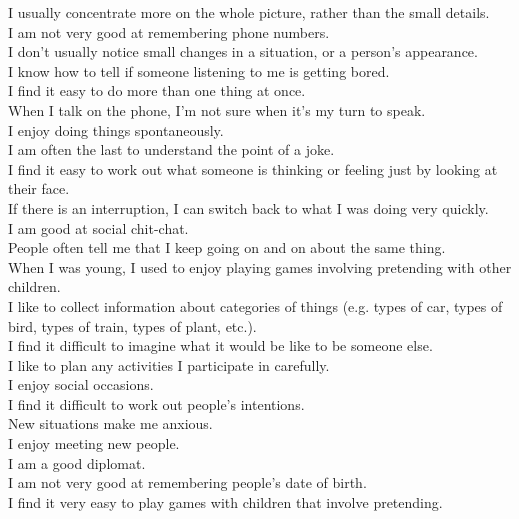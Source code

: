 \documentclass[a4paper, 11pt]{article}
\begin{document}
I usually concentrate more on the whole picture, rather than the small details.\\
I am not very good at remembering phone numbers.\\
I don't usually notice small changes in a situation, or a person's appearance.\\
I know how to tell if someone listening to me is getting bored.\\
I find it easy to do more than one thing at once.\\
When I talk on the phone, I'm not sure when it's my turn to speak.\\
I enjoy doing things spontaneously.\\
I am often the last to understand the point of a joke.\\
I find it easy to work out what someone is thinking or feeling just by looking at their face.\\
If there is an interruption, I can switch back to what I was doing very quickly. \\
I am good at social chit-chat.\\
People often tell me that I keep going on and on about the same thing.\\
When I was young, I used to enjoy playing games involving pretending with other children.\\
I like to collect information about categories of things (e.g. types of car, types of bird, types of train, types of plant, etc.).\\
I find it difficult to imagine what it would be like to be someone else.\\
I like to plan any activities I participate in carefully.\\
I enjoy social occasions.\\
I find it difficult to work out people's intentions.\\
New situations make me anxious.\\
I enjoy meeting new people.\\
I am a good diplomat.\\
I am not very good at remembering people's date of birth.\\
I find it very easy to play games with children that involve pretending.\\
\end{document}
